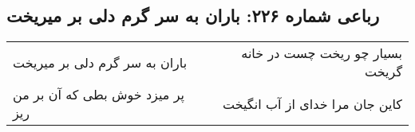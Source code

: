 \begin{center}
\section*{رباعی شماره ۲۲۶: باران به سر گرم دلی بر میریخت}
\label{sec:0226}
\begin{longtable}{l p{0.5cm} r}
باران به سر گرم دلی بر میریخت
&&
بسیار چو ریخت چست در خانه گریخت
\\
پر میزد خوش بطی که آن بر من ریز
&&
کاین جان مرا خدای از آب انگیخت
\\
\end{longtable}
\end{center}
